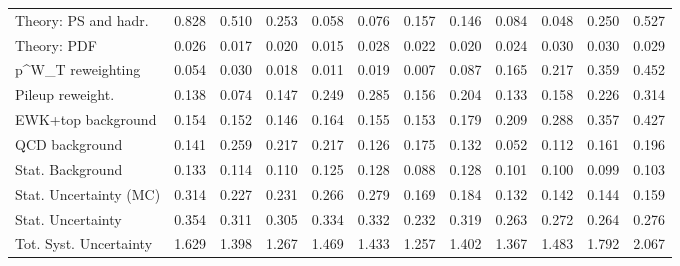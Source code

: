 \begin{tabular}{l|p{0.6cm}p{0.6cm}p{0.6cm}p{0.6cm}p{0.6cm}p{0.6cm}p{0.6cm}p{0.6cm}p{0.6cm}p{0.6cm}p{0.6cm}}
Theory: PS and hadr.                     & 0.828 & 0.510 & 0.253 & 0.058 & 0.076 & 0.157 & 0.146 & 0.084 & 0.048 & 0.250 & 0.527 \\
Theory: PDF                              & 0.026 & 0.017 & 0.020 & 0.015 & 0.028 & 0.022 & 0.020 & 0.024 & 0.030 & 0.030 & 0.029 \\
p^{W}_{T} reweighting                    & 0.054 & 0.030 & 0.018 & 0.011 & 0.019 & 0.007 & 0.087 & 0.165 & 0.217 & 0.359 & 0.452 \\
Pileup reweight.                         & 0.138 & 0.074 & 0.147 & 0.249 & 0.285 & 0.156 & 0.204 & 0.133 & 0.158 & 0.226 & 0.314 \\
EWK+top background                       & 0.154 & 0.152 & 0.146 & 0.164 & 0.155 & 0.153 & 0.179 & 0.209 & 0.288 & 0.357 & 0.427 \\
QCD background                           & 0.141 & 0.259 & 0.217 & 0.217 & 0.126 & 0.175 & 0.132 & 0.052 & 0.112 & 0.161 & 0.196 \\
Stat. Background                         & 0.133 & 0.114 & 0.110 & 0.125 & 0.128 & 0.088 & 0.128 & 0.101 & 0.100 & 0.099 & 0.103 \\
Stat. Uncertainty (MC)                   & 0.314 & 0.227 & 0.231 & 0.266 & 0.279 & 0.169 & 0.184 & 0.132 & 0.142 & 0.144 & 0.159 \\
\hline
Stat. Uncertainty                        & 0.354 & 0.311 & 0.305 & 0.334 & 0.332 & 0.232 & 0.319 & 0.263 & 0.272 & 0.264 & 0.276 \\
\hline
Tot. Syst. Uncertainty                   & 1.629 & 1.398 & 1.267 & 1.469 & 1.433 & 1.257 & 1.402 & 1.367 & 1.483 & 1.792 & 2.067 \\
\hline
\end{tabular}
